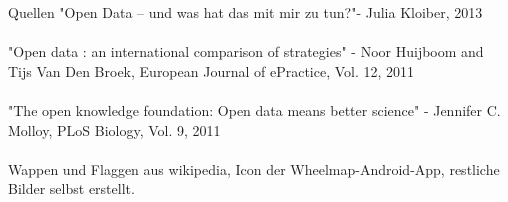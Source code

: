 \begin{frame}[t]{Quellen}
"Open Data -- und was hat das mit mir zu tun?"- Julia Kloiber, 2013\\
~\\
"Open data : an international comparison of strategies"
- Noor Huijboom and Tijs Van Den Broek, European Journal of ePractice, Vol. 12, 2011\\
~\\
"The open knowledge foundation: Open data means better science"
- Jennifer C. Molloy, PLoS Biology, Vol. 9, 2011\\
~\\
Wappen und Flaggen aus wikipedia, Icon der Wheelmap-Android-App, restliche Bilder selbst erstellt.
\end{frame}


\nocite{*}


